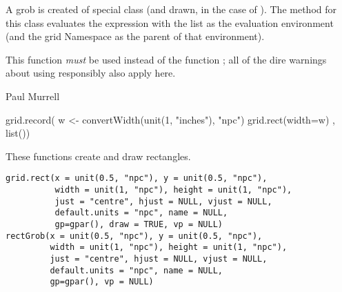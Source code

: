 %
\begin{Details}\relax
A grob is created of special class 
(and drawn, in the case of ).
The  method for this class
evaluates the expression with the list as the evaluation
environment (and the grid Namespace as the parent of that
environment).
\end{Details}
%
\begin{Note}\relax
 This function \emph{must} be used instead of the
function ;  all of the dire warnings
about using  responsibly also apply here.
\end{Note}
%
\begin{Author}\relax
 Paul Murrell 
\end{Author}
%
\begin{SeeAlso}\relax
\end{SeeAlso}
%
\begin{Examples}
\begin{ExampleCode}
grid.record({
              w <- convertWidth(unit(1, "inches"), "npc")
              grid.rect(width=w)
            },
            list())
\end{ExampleCode}
\end{Examples}
%
\begin{Description}\relax
These functions create and draw rectangles.
\end{Description}
%
\begin{Usage}
\begin{verbatim}
grid.rect(x = unit(0.5, "npc"), y = unit(0.5, "npc"),
          width = unit(1, "npc"), height = unit(1, "npc"),
          just = "centre", hjust = NULL, vjust = NULL,
          default.units = "npc", name = NULL,
          gp=gpar(), draw = TRUE, vp = NULL)
rectGrob(x = unit(0.5, "npc"), y = unit(0.5, "npc"),
         width = unit(1, "npc"), height = unit(1, "npc"),
         just = "centre", hjust = NULL, vjust = NULL, 
         default.units = "npc", name = NULL,
         gp=gpar(), vp = NULL)
\end{verbatim}
\end{Usage}
%
